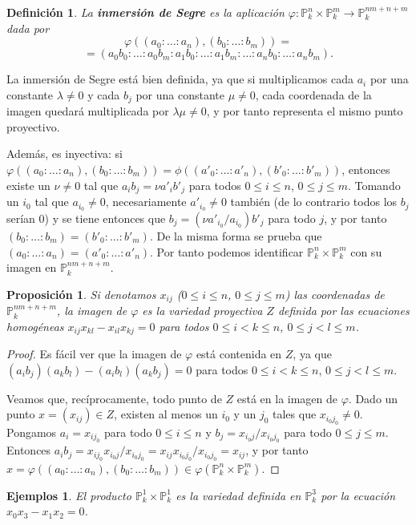 \documentclass[a4paper,10pt]{book}
\newtheorem{prop}[thm]{Proposición}
\newtheorem{defn}[thm]{Definición}
\newtheorem{eje}[thm]{Ejemplos}
\newcommand{\PP}{\mathbb P}
\newcommand{\Pnk}{\PP^n_k}
\newcommand{\Pmk}{\PP^m_k}
\begin{document}
\begin{defn} La {\bf inmersión de Segre} es la aplicación $\varphi:\Pnk\times\Pmk\to\PP^{nm+n+m}_k$ dada por
 $$
\varphi((a_0:\ldots:a_n),(b_0:\ldots:b_m))=
$$
$$
=(a_0b_0:\ldots:a_0b_m:a_1b_0:\ldots:a_1b_m:\ldots:a_nb_0:\ldots:a_nb_m).
$$
\end{defn}

La inmersión de Segre está bien definida, ya que si multiplicamos cada $a_i$ por una constante $\lambda\neq 0$ y cada $b_j$ por una constante $\mu\neq 0$, cada coordenada de la imagen quedará multiplicada por $\lambda\mu\neq 0$, y por tanto representa el mismo punto proyectivo.

Además, es inyectiva: si $\varphi((a_0:\ldots:a_n),(b_0:\ldots:b_m))=\phi((a'_0:\ldots:a'_n),(b'_0:\ldots:b'_m))$, entonces existe un $\nu\neq 0$ tal que $a_ib_j=\nu a'_ib'_j$ para todos $0\leq i\leq n$, $0\leq j\leq m$. Tomando un $i_0$ tal que $a_{i_0}\neq 0$, necesariamente $a'_{i_0}\neq 0$ también (de lo contrario todos los $b_j$ serían $0$) y se tiene entonces que $b_j=(\nu a'_{i_0}/a_{i_0})b'_j$ para todo $j$, y por tanto $(b_0:\ldots:b_m)=(b'_0:\ldots:b'_m)$. De la misma forma se prueba que $(a_0:\ldots:a_n)=(a'_0:\ldots:a'_n)$. Por tanto podemos identificar $\Pnk\times\Pmk$ con su imagen en $\PP^{nm+n+m}_k$.

\begin{prop}
 Si denotamos $x_{ij}$ ($0\leq i\leq n$, $0\leq j\leq m$) las coordenadas de $\PP^{nm+n+m}_k$, la imagen de $\varphi$ es la variedad proyectiva $Z$ definida por las ecuaciones homogéneas $x_{ij}x_{kl}-x_{il}x_{kj}=0$ para todos $0\leq i<k\leq n$, $0\leq j<l\leq m$. 
\end{prop}

\begin{proof}
 Es fácil ver que la imagen de $\varphi$ está contenida en $Z$, ya que $(a_ib_j)(a_kb_l)-(a_ib_l)(a_kb_j)=0$ para todos $0\leq i<k\leq n$, $0\leq j<l\leq m$. 

Veamos que, recíprocamente, todo punto de $Z$ está en la imagen de $\varphi$. Dado un punto $x=(x_{ij})\in Z$, existen al menos un $i_0$ y un $j_0$ tales que $x_{i_0j_0}\neq 0$. Pongamos $a_i=x_{ij_0}$ para todo $0\leq i\leq n$ y $b_j=x_{i_0j}/x_{i_0j_0}$ para todo $0\leq j\leq m$. Entonces $a_ib_j=x_{ij_0}x_{i_0j}/x_{i_0j_0}=x_{ij}x_{i_0j_0}/x_{i_0j_0}=x_{ij}$, y por tanto $x=\varphi((a_0:\ldots:a_n),(b_0:\ldots:b_m))\in\varphi(\Pnk\times\Pmk)$.
\end{proof}

\begin{eje}
 El producto $\PP^1_k\times\PP^1_k$ es la variedad definida en $\PP^3_k$ por la ecuación $x_0x_3-x_1x_2=0$.
\end{eje}
\end{document}
